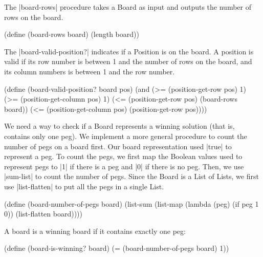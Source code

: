 \begin{schemeregion}
{The \scheme|board-rows| procedure takes a Board as input and outputs the number of rows on the board.
\begin{schemedisplay}
(define (board-rows board) (length board))
\end{schemedisplay}

The \scheme|board-valid-position?| indicates if a Position is on the board.  A position is valid if its row number is between 1 and the number of rows on the board, and its column numbers is between 1 and the row number.
\begin{schemedisplay}
(define (board-valid-position? board pos)
  (and (>= (position-get-row pos) 1) (>= (position-get-column pos) 1)
       (<= (position-get-row pos) (board-rows board))
       (<= (position-get-column pos) (position-get-row pos))))
\end{schemedisplay}

We need a way to check if a Board represents a winning solution (that is, contains only one peg).  We implement a more general procedure to count the number of pegs on a board first.  Our board representation used \scheme|true| to represent a peg.  To count the pegs, we first map the Boolean values used to represent pegs to \scheme|1| if there is a peg and \scheme|0| if there is no peg.  Then, we use \scheme|sum-list| to count the number of pegs.  Since the Board is a List of Lists, we first use \scheme|list-flatten| to put all the pegs in a single List.
\begin{schemedisplay}
(define (board-number-of-pegs board)
  (list-sum
   (list-map (lambda (peg) (if peg 1 0)) (list-flatten board))))
\end{schemedisplay}
A board is a winning board if it contains exactly one peg:
\begin{schemedisplay}
(define (board-is-winning? board) 
   (= (board-number-of-pegs board) 1))
\end{schemedisplay}

}
\end{schemeregion}
